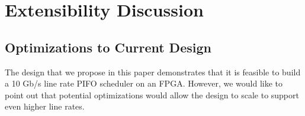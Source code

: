 \section{Extensibility Discussion}


\subsection{Optimizations to Current Design}\label{sec:optimizations}
The design that we propose in this paper demonstrates that it is feasible to build a 10 Gb/s line rate PIFO scheduler on an FPGA. However, we would like to point out that potential optimizations would allow the design to scale to support even higher line rates.


